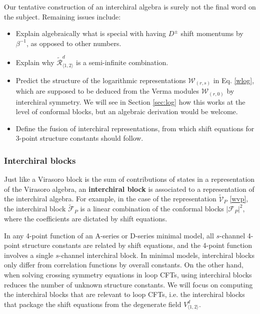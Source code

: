 \documentclass[12pt, a4paper]{article}
\newcommand{\myindex}[1]{\textbf{\boldmath #1}}
\begin{document}
Our tentative construction of an interchiral algebra is surely not the final word on the subject. Remaining issues include:
\begin{itemize}
\item Explain algebraically what is special with having $D^\pm$ shift momentums by $\beta^{-1}$, as opposed to other numbers. 
 \item Explain why $\widetilde{\mathcal{R}}^d_{\langle 1,2\rangle}$ is a semi-infinite combination.
 \item Predict the structure of the logarithmic representations $\mathcal{W}_{(r,s)}$ in Eq. \eqref{wlog}, which are supposed to be deduced from the Verma modules $\mathcal{W}_{(r,0)}$ by interchiral symmetry. We will see in Section \ref{sec:log} how this works at the level of conformal blocks, but an algebraic derivation would be welcome. 
 \item Define the fusion of interchiral representations, from which shift equations for 3-point structure constants should follow.
\end{itemize}


\subsubsection{Interchiral blocks}\label{sec:ib}

Just like a Virasoro block is the sum of contributions of states in a representation of the Virasoro algebra, an \myindex{interchiral block} is associated to a representation of the interchiral algebra. For example, in the case of the representation $\widetilde{\mathcal{V}}_P$ \eqref{wvp}, the interchiral block $\widetilde{\mathcal{F}}_P$ is a linear combination of the conformal blocks $\left|\mathcal{F}_P\right|^2$, where the coefficients are dictated by shift equations. 

In any 4-point function of an A-series or D-series minimal model, all $s$-channel 4-point structure constants are related by shift equations, and the 4-point function involves a single $s$-channel interchiral block. In minimal models, interchiral blocks only differ from correlation functions by overall constants. On the other hand, when solving crossing symmetry equations in loop CFTs, using interchiral blocks reduces the number of unknown structure constants. We will focus on computing the interchiral blocks that are relevant to loop CFTs, i.e. the interchiral blocks that package the shift equations from the degenerate field $V^d_{\langle 1,2\rangle}$.  
\end{document}
